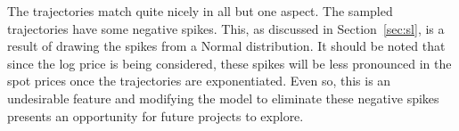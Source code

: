 The trajectories match quite nicely in all but one aspect. The sampled trajectories have some negative spikes. This, as discussed in Section~\ref{sec:sl}, is a result of drawing the spikes from a Normal distribution. It should be noted that since the log price is being considered, these spikes will be less pronounced in the spot prices once the trajectories are exponentiated. Even so, this is an undesirable feature and modifying the model to eliminate these negative spikes presents an opportunity for future projects to explore.